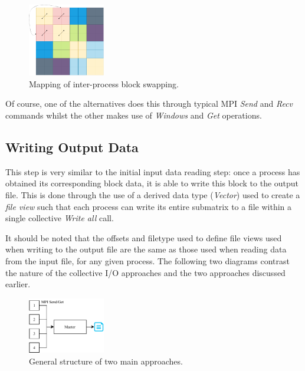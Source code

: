 \documentclass[journal,10pt,a4paper]{IEEEtran}
\begin{document}
\begin{figure}[H]
    \centering
    \includegraphics[width=0.3\textwidth]{block.pdf}
    \caption{Mapping of inter-process block swapping.}
    \label{fig:my_label}
\end{figure}

Of course, one of the alternatives does this through typical MPI \textit{Send} and \textit{Recv} commands whilst the other makes use of \textit{Windows} and \textit{Get} operations.



\subsection{Writing Output Data}

This step is very similar to the initial input data reading step: once a process has obtained its corresponding block data, it is able to write this block to the output file. This is done through the use of a derived data type (\textit{Vector}) used to create a \textit{file view} such that each process can write its entire submatrix to a file within a single collective \textit{Write all} call.%

It should be noted that the offsets and filetype used to define file views used when writing to the output file are the same as those used when reading data from the input file, for any given process. The following two diagrams contrast the nature of the collective I/O approaches and the two approaches discussed earlier.

\begin{figure}[H]
    \centering
    \includegraphics[width=0.3\textwidth]{norm.pdf}
    \caption{General structure of two main approaches.}
    \label{fig:my_label}
\end{figure}
\end{document}
